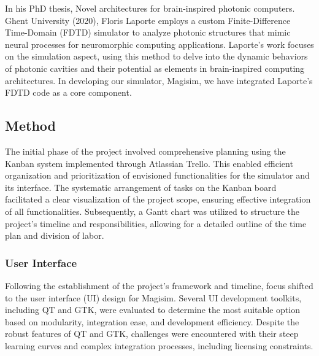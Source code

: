 \documentclass[11pt, a4paper, titlepage]{article}
\begin{document}
In his PhD thesis, Novel architectures for brain-inspired photonic computers. Ghent University (2020), Floris Laporte employs a custom Finite-Difference Time-Domain (FDTD) simulator to analyze photonic structures that mimic neural processes for neuromorphic computing applications. Laporte's work focuses on the simulation aspect, using this method to delve into the dynamic behaviors of photonic cavities and their potential as elements in brain-inspired computing architectures. In developing our simulator, Magisim, we have integrated Laporte's FDTD code as a core component.

\newpage
\subsection{Method}
The initial phase of the project involved comprehensive planning using the Kanban system implemented through Atlassian Trello. This enabled efficient organization and prioritization of envisioned functionalities for the simulator and its interface. The systematic arrangement of tasks on the Kanban board facilitated a clear visualization of the project scope, ensuring effective integration of all functionalities. Subsequently, a Gantt chart was utilized to structure the project's timeline and responsibilities, allowing for a detailed outline of the time plan and division of labor.

\subsubsection{User Interface}

Following the establishment of the project's framework and timeline, focus shifted to the user interface (UI) design for Magisim. Several UI development toolkits, including QT and GTK, were evaluated to determine the most suitable option based on modularity, integration ease, and development efficiency. Despite the robust features of QT and GTK, challenges were encountered with their steep learning curves and complex integration processes, including licensing constraints.
\end{document}
